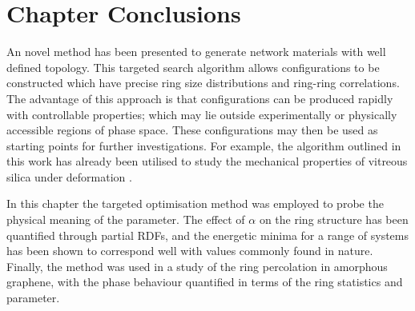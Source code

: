 \section{Chapter Conclusions}

An novel method has been presented to generate \td{} network materials with well defined topology. 
This targeted \mc{} search algorithm allows configurations to be constructed which have precise ring size distributions and ring\--ring correlations.
The advantage of this approach is that configurations can be produced rapidly with controllable properties; which may lie outside experimentally or physically accessible regions of phase space.
These configurations may then be used as starting points for further investigations.
For example, the algorithm outlined in this work has already been utilised to study the mechanical properties of vitreous silica under deformation \cite{Bamer2020,Ebrahem2020a}.

In this chapter the targeted optimisation method was employed to probe the physical meaning of the \aw{} parameter.
The effect of $\alpha$ on the ring structure has been quantified through partial RDFs, and the energetic minima for a range of systems has been shown to correspond well with values commonly found in nature.
Finally, the method was used in a study of the ring percolation in amorphous graphene, with the phase behaviour quantified in terms of the ring statistics and \aw{} parameter.

 





